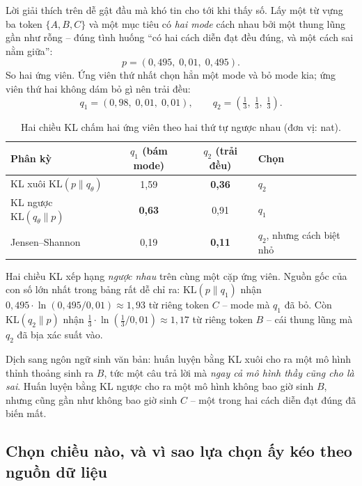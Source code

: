 Lời giải thích trên dễ gật đầu mà khó tin cho tới khi thấy số. Lấy một từ vựng ba token $\{A, B, C\}$ và một mục tiêu có \emph{hai mode} cách nhau bởi một thung lũng gần như rỗng -- đúng tình huống ``có hai cách diễn đạt đều đúng, và một cách sai nằm giữa'':
\[
p = (0{,}495,\; 0{,}01,\; 0{,}495).
\]
So hai ứng viên. Ứng viên thứ nhất chọn hẳn một mode và bỏ mode kia; ứng viên thứ hai không dám bỏ gì nên trải đều:
\[
q_1 = (0{,}98,\; 0{,}01,\; 0{,}01),
\qquad
q_2 = (\tfrac13,\; \tfrac13,\; \tfrac13).
\]

\begin{table}[H]
\centering\small
\caption{Hai chiều KL chấm hai ứng viên theo hai thứ tự ngược nhau (đơn vị: nat).}
\label{tab:kl_worked_example}
\begin{tabularx}{\textwidth}{@{}Xccl@{}}
\toprule
\textbf{Phân kỳ} & \textbf{$q_1$ (bám mode)} & \textbf{$q_2$ (trải đều)} & \textbf{Chọn} \\
\midrule
KL xuôi $\mathrm{KL}(p\|q_\theta)$ & 1,59 & \textbf{0,36} & $q_2$ \\
KL ngược $\mathrm{KL}(q_\theta\|p)$ & \textbf{0,63} & 0,91 & $q_1$ \\
Jensen--Shannon & 0,19 & \textbf{0,11} & $q_2$, nhưng cách biệt nhỏ \\
\bottomrule
\end{tabularx}
\end{table}

Hai chiều KL xếp hạng \emph{ngược nhau} trên cùng một cặp ứng viên. Nguồn gốc của con số lớn nhất trong bảng rất dễ chỉ ra: $\mathrm{KL}(p\|q_1)$ nhận $0{,}495 \cdot \ln(0{,}495/0{,}01) \approx 1{,}93$ từ riêng token $C$ -- mode mà $q_1$ đã bỏ. Còn $\mathrm{KL}(q_2\|p)$ nhận $\tfrac13 \cdot \ln(\tfrac13/0{,}01) \approx 1{,}17$ từ riêng token $B$ -- cái thung lũng mà $q_2$ đã bịa xác suất vào.

Dịch sang ngôn ngữ sinh văn bản: huấn luyện bằng KL xuôi cho ra một mô hình thỉnh thoảng sinh ra $B$, tức một câu trả lời mà \emph{ngay cả mô hình thầy cũng cho là sai}. Huấn luyện bằng KL ngược cho ra một mô hình không bao giờ sinh $B$, nhưng cũng gần như không bao giờ sinh $C$ -- một trong hai cách diễn đạt đúng đã biến mất.

\subsection{Chọn chiều nào, và vì sao lựa chọn ấy kéo theo nguồn dữ liệu}
\label{ssec:kl_direction_distillation}

